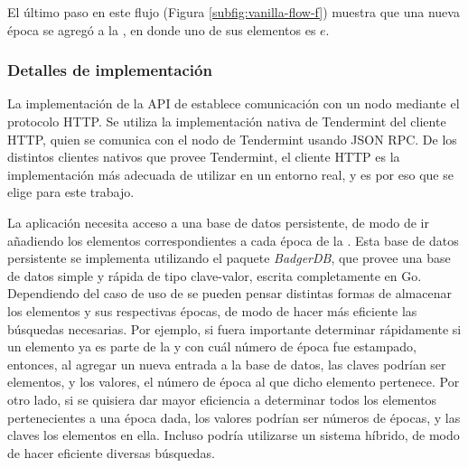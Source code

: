 %
El último paso en este flujo (Figura \ref{subfig:vanilla-flow-f}) muestra que una nueva época se agregó a la \setchain,
en donde uno de sus elementos es $e$.

\subsubsection{Detalles de implementación}
La implementación de la API de \setchain establece comunicación con un nodo mediante el protocolo HTTP.
%
Se utiliza la implementación nativa de Tendermint del cliente HTTP,
quien se comunica con el nodo de Tendermint usando JSON RPC.
%
De los distintos clientes nativos que provee Tendermint, el cliente HTTP
es la implementación más adecuada de utilizar en un entorno
real, y es por eso que se elige para este trabajo.

La aplicación necesita acceso a una base de datos persistente, de modo de ir añadiendo
los elementos correspondientes a cada época de la \setchain.
%
Esta base de datos persistente se implementa utilizando el paquete \textit{BadgerDB}\cite{db.badger},
que provee una base de datos simple y rápida de tipo clave-valor, escrita completamente en Go.
%
Dependiendo del caso de uso de \setchain se pueden pensar distintas formas de almacenar los elementos y sus
respectivas épocas, de modo de hacer más eficiente las búsquedas necesarias.
%
Por ejemplo, si fuera importante determinar rápidamente si un elemento ya es parte de la \setchain y con cuál número de época
fue estampado, entonces, al agregar un nueva entrada a la base de datos, las claves podrían ser elementos, y los
valores, el número de época al que dicho elemento pertenece.
%
Por otro lado, si se quisiera dar mayor eficiencia a determinar todos los elementos pertenecientes a una época dada,
los valores podrían ser números de épocas, y las claves los elementos en ella.
%
Incluso podría utilizarse un sistema híbrido, de modo de hacer eficiente diversas búsquedas.

